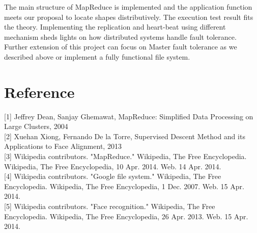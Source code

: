 \documentclass[12pt]{article}
\begin{document}
The main structure of MapReduce is implemented and the application function meets our proposal to locate shapes distributively. The execution test result fits the theory. Implementing the replication and heart-beat using different mechanism sheds lights on how distributed systems handle fault tolerance. Further extension of this project can focus on Master fault tolerance as we described above or implement a fully functional file system. 
\section*{Reference}

[1] Jeffrey Dean, Sanjay Ghemawat, MapReduce: Simplified Data Processing on Large Clusters, 2004 \\
{[2]} Xuehan Xiong, Fernando De la Torre, Supervised Descent Method and its Applications to Face Alignment, 2013\\
{[3]} Wikipedia contributors. "MapReduce." Wikipedia, The Free Encyclopedia. Wikipedia, The Free Encyclopedia, 10 Apr. 2014. Web. 14 Apr. 2014. \\
{[4]} Wikipedia contributors. "Google file system." Wikipedia, The Free Encyclopedia. Wikipedia, The Free Encyclopedia, 1 Dec. 2007. Web. 15 Apr. 2014. \\
{[5]} Wikipedia contributors. "Face recognition." Wikipedia, The Free Encyclopedia. Wikipedia, The Free Encyclopedia, 26 Apr. 2013. Web. 15 Apr. 2014.
\end{document}
